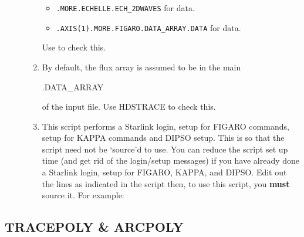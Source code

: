 \documentclass[twoside,11pt]{starlink}
\begin{document}
\begin{description}
\begin{enumerate}
\begin{itemize}
\item \verb+.MORE.ECHELLE.ECH_2DWAVES+ for  data.

\item \verb+.AXIS(1).MORE.FIGARO.DATA_ARRAY.DATA+ for
       data.

\end{itemize}

      Use  to check this.

\item By default, the flux array is assumed to be in the main

\begin{terminalv}
   .DATA_ARRAY
\end{terminalv}

      of the input file.  Use HDSTRACE to check this.

\item This script performs a Starlink login, setup for FIGARO
      commands, setup for KAPPA commands and DIPSO setup.  This is
      so that the script need not be `source'd to use.  You can
      reduce the script set up time (and get rid of the login/setup
      messages) if you have already done a Starlink login, setup for
      FIGARO, KAPPA, and DIPSO.  Edit out the lines as indicated
      in the script then, to use this script, you \textbf{must} source it.
      For example:

\begin{terminalv}
\end{terminalv}
\end{enumerate}
\end{description}


\newpage
\subsection{\label{se_tracepoly}TRACEPOLY \& ARCPOLY}
\end{document}
